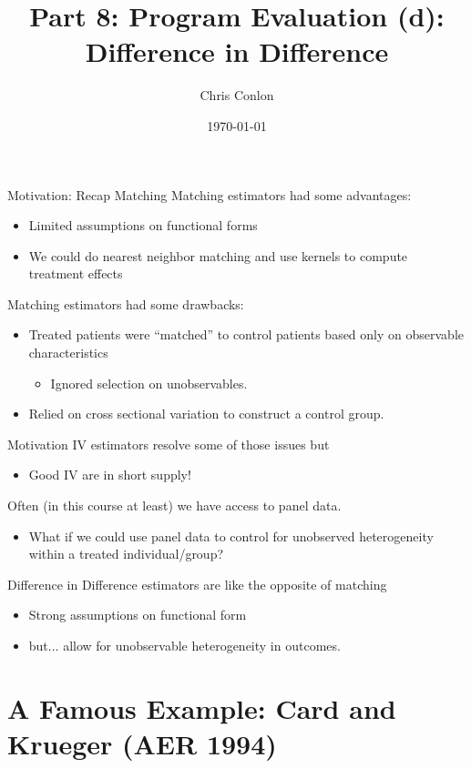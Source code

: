 \documentclass[xcolor=pdftex,dvipsnames,table,mathserif,aspectratio=169]{beamer}
\begin{document}
\title{Part 8: Program Evaluation (d): \\
 Difference in Difference}
\author{Chris Conlon}
\date{\today}

\frame{\titlepage}

\begin{frame}{Motivation: Recap Matching}
Matching estimators had some advantages:
\begin{itemize}
\item Limited assumptions on \alert{functional forms}
\item We could do nearest neighbor matching and use kernels to compute treatment effects
\end{itemize}
Matching estimators had some drawbacks:
\begin{itemize}
\item Treated patients were ``matched'' to control patients based only on \alert{observable characteristics}
\begin{itemize}
\item Ignored \alert{selection on unobservables}.
\end{itemize}
\item Relied on \alert{cross sectional} variation to construct a control group.
\end{itemize}
\end{frame}


\begin{frame}{Motivation}
IV estimators resolve some of those issues but
\begin{itemize}
\item Good IV are in short supply!
\end{itemize}
 Often (in this course at least) we have access to \alert{panel data}.
\begin{itemize}
\item What if we could use panel data to control for \alert{unobserved heterogeneity} within a treated individual/group?
\end{itemize}
\alert{Difference in Difference} estimators are like the opposite of matching
\begin{itemize}
\item \alert{Strong} assumptions on \alert{functional form}
\item but... allow for \alert{unobservable heterogeneity} in outcomes.
\end{itemize}
\end{frame}


\section{A Famous Example: Card and Krueger (AER 1994)}
\end{document}
